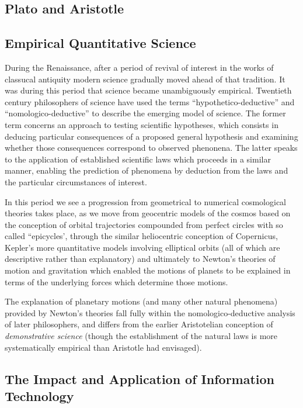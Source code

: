\documentclass[10pt,titlepage]{book}
\begin{document}
\subsection{Plato and Aristotle}

\subsection{Empirical Quantitative Science}

During the Renaissance, after a period of revival of interest in the works of classucal antiquity modern science gradually moved ahead of that tradition.
It was during this period that science became unambiguously empirical.
Twentieth century philosophers of science have used the terms ``hypothetico-deductive'' and ``nomologico-deductive'' to describe the emerging model of science.
The former term concerns an approach to testing scientific hypotheses, which consists in deducing particular consequences of a proposed general hypothesis and examining whether those consequences correspond to observed phenonena.
The latter speaks to the application of established scientific laws which proceeds in a similar manner, enabling the prediction of phenomena by deduction from the laws and the particular circumstances of interest.

In this period we see a progression from geometrical to numerical cosmological theories takes place, as we move from geocentric models of the cosmos based on the conception of orbital trajectories compounded from perfect circles with so called ``epicycles', through the similar heliocentric conception of Copernicus, Kepler's more quantitative models involving elliptical orbits (all of which are descriptive rather than explanatory) and ultimately to Newton's theories of motion and gravitation which enabled the motions of planets to be explained in terms of the underlying forces which determine those motions.

The explanation of planetary motions (and many other natural phenomena) provided by Newton's theories fall fully within the nomologico-deductive analysis of later philosophers, and differs from the earlier Aristotelian conception of \emph{demonstrative science} (though the establishment of the natural laws is more systematically empirical than Aristotle had envisaged).



\subsection{The Impact and Application of Information Technology}
\end{document}
